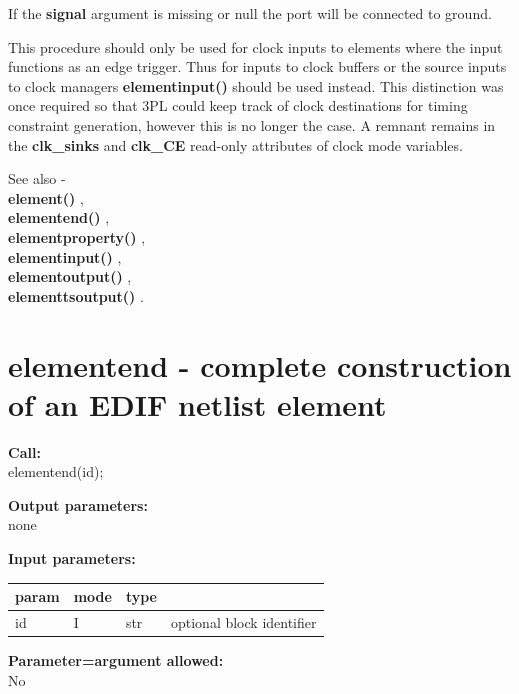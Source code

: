         If the {\bf signal} argument is missing or null the port will be
        connected to ground.

        This procedure should only be used for clock inputs to elements where
        the input functions as an edge trigger. Thus for inputs to clock buffers
        or the source inputs to clock managers {\bf elementinput()}
         should be used instead. This distinction was
        once required so that 3PL could keep track of clock destinations for
        timing constraint generation, however this is no longer the case. A
        remnant remains in the {\bf clk\_sinks} and {\bf clk\_CE} read-only
        attributes of clock mode variables.

        See also - \\
        {\bf element()} , \\
        {\bf elementend()} , \\
        {\bf elementproperty()} , \\
        {\bf elementinput()} , \\
        {\bf elementoutput()} , \\
        {\bf elementtsoutput()} .




    \section{elementend - complete construction of an EDIF netlist element}\label{sec:ipelementend}
        
        {\bf Call:} \\
        elementend(id);
        
        {\bf Output parameters:} \\
        none
        
        {\bf Input parameters:} \\
        \begin{tabular}{| l | l | l | l |}
        \hline
        param  & mode     & type  & \\
        \hline \hline
        id         & I    & str & optional block identifier \\ \hline
        \end{tabular}
        
        {\bf Parameter=argument allowed:} \\
        No
        
